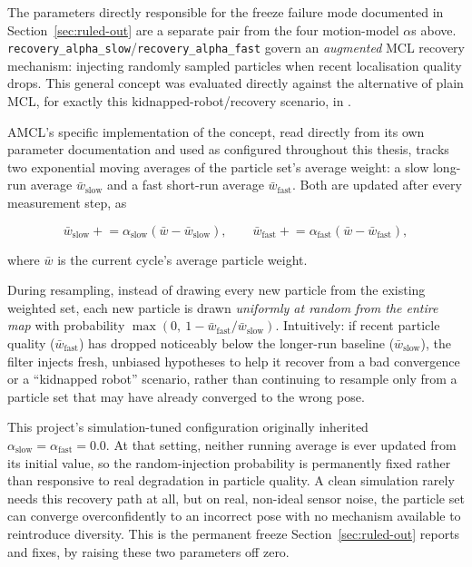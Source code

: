 The parameters directly responsible for the freeze failure mode
documented in Section~\ref{sec:ruled-out} are a separate pair from
the four motion-model $\alpha$s above.
\texttt{recovery\_alpha\_slow}/\texttt{recovery\_alpha\_fast} govern
an \emph{augmented} MCL recovery mechanism: injecting randomly
sampled particles when recent localisation quality drops. This
general concept was evaluated directly against the alternative of
plain MCL, for exactly this kidnapped-robot/recovery scenario, in
\cite{thrun2001robustmcl}.

AMCL's specific implementation of the concept, read directly from
its own parameter documentation and used as configured throughout
this thesis, tracks two exponential moving averages of the particle
set's average weight: a slow long-run average $\bar{w}_{\text{slow}}$
and a fast short-run average $\bar{w}_{\text{fast}}$. Both are
updated after every measurement step, as

\begin{equation}
  \bar{w}_{\text{slow}} \mathrel{+}= \alpha_{\text{slow}}\left(\bar{w} - \bar{w}_{\text{slow}}\right), \qquad
  \bar{w}_{\text{fast}} \mathrel{+}= \alpha_{\text{fast}}\left(\bar{w} - \bar{w}_{\text{fast}}\right),
  \label{eq:amcl-recovery}
\end{equation}

where $\bar{w}$ is the current cycle's average particle weight.

During resampling, instead of drawing every new particle from the
existing weighted set, each new particle is drawn \emph{uniformly at
random from the entire map} with probability $\max\!\left(0,\ 1 -
\bar{w}_{\text{fast}}/\bar{w}_{\text{slow}}\right)$. Intuitively: if
recent particle quality ($\bar{w}_{\text{fast}}$) has dropped
noticeably below the longer-run baseline ($\bar{w}_{\text{slow}}$),
the filter injects fresh, unbiased hypotheses to help it recover
from a bad convergence or a ``kidnapped robot'' scenario, rather than
continuing to resample only from a particle set that may have
already converged to the wrong pose.

This project's simulation-tuned configuration originally inherited
$\alpha_{\text{slow}} = \alpha_{\text{fast}} = 0.0$. At that setting,
neither running average is ever updated from its initial value, so
the random-injection probability is permanently fixed rather than
responsive to real degradation in particle quality. A clean
simulation rarely needs this recovery path at all, but on real,
non-ideal sensor noise, the particle set can converge overconfidently
to an incorrect pose with no mechanism available to reintroduce
diversity. This is the permanent freeze Section~\ref{sec:ruled-out}
reports and fixes, by raising these two parameters off zero.

